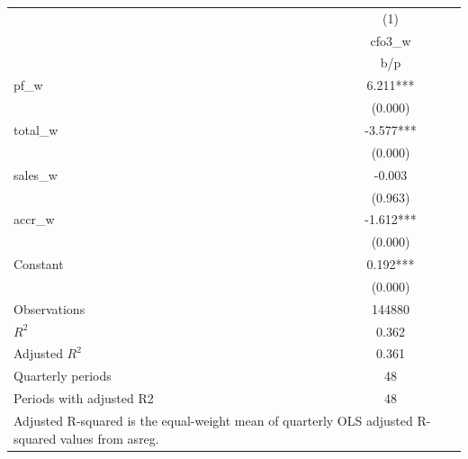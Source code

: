 {
\def\sym#1{\ifmmode^{#1}\else\(^{#1}\)\fi}
\begin{tabular}{l*{1}{c}}
\hline\hline
                    &\multicolumn{1}{c}{(1)}\\
                    &\multicolumn{1}{c}{cfo3\_w}\\
                    &         b/p   \\
\hline
pf\_w                &       6.211***\\
                    &     (0.000)   \\
total\_w             &      -3.577***\\
                    &     (0.000)   \\
sales\_w             &      -0.003   \\
                    &     (0.963)   \\
accr\_w              &      -1.612***\\
                    &     (0.000)   \\
Constant            &       0.192***\\
                    &     (0.000)   \\
\hline
Observations        &      144880   \\
\(R^{2}\)           &       0.362   \\
Adjusted \(R^{2}\)  &       0.361   \\
Quarterly periods   &          48   \\
Periods with adjusted R2&          48   \\
\hline\hline
\multicolumn{2}{l}{\footnotesize Adjusted R-squared is the equal-weight mean of quarterly OLS adjusted R-squared values from asreg.}\\
\end{tabular}
}
